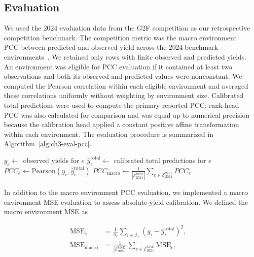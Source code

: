 \subsection{Evaluation}
We used the 2024 evaluation data from the G2F competition \cite{g2f-2024-competition} as our retrospective competition benchmark. The competition metric was the macro environment PCC between predicted and observed yield across the 2024 benchmark environments~\cite{batista2026competition}. We retained only rows with finite observed and predicted yields. An environment was eligible for PCC evaluation if it contained at least two observations and both its observed and predicted values were nonconstant. We computed the Pearson correlation within each eligible environment and averaged these correlations uniformly without weighting by environment size. Calibrated total predictions were used to compute the primary reported PCC; rank-head PCC was also calculated for comparison and was equal up to numerical precision because the calibration head applied a constant positive affine transformation within each environment. The evaluation procedure is summarized in Algorithm~\ref{alg:ch3-eval-pcc}.

\begin{algorithm}
\caption{Macro Environment PCC Evaluation}
\label{alg:ch3-eval-pcc}
\begin{algorithmic}
    \State $y_e \gets$ observed yields for $e$
    \State $\hat{y}^{\mathrm{total}}_e \gets$ calibrated total predictions for $e$
    \State $PCC_e \gets \text{Pearson}(y_e, \hat{y}^{\mathrm{total}}_e)$
\EndFor
\State $PCC_{\mathrm{macro}} \gets \frac{1}{|\mathcal{E}^{\mathrm{valid}}_{2024}|} \sum_{e \in \mathcal{E}^{\mathrm{valid}}_{2024}} PCC_e$
\end{algorithmic}
\end{algorithm}

In addition to the macro environment PCC evaluation, we implemented a macro environment MSE evaluation to assess absolute-yield calibration. We defined the macro environment MSE as

\begin{equation}\label{eq:ch3-macro-env-mse}
\begin{aligned}
    \mathrm{MSE}_e
    &= \frac{1}{n_e}\sum_{i \in \mathcal{I}_e}
    \left(y_i-\hat{y}^{\mathrm{total}}_i\right)^2, \\
    \mathrm{MSE}_{\mathrm{macro}}
    &= \frac{1}{|\mathcal{E}^{\mathrm{MSE}}_{2024}|}
    \sum_{e \in \mathcal{E}^{\mathrm{MSE}}_{2024}}\mathrm{MSE}_e,
\end{aligned}
\end{equation}

